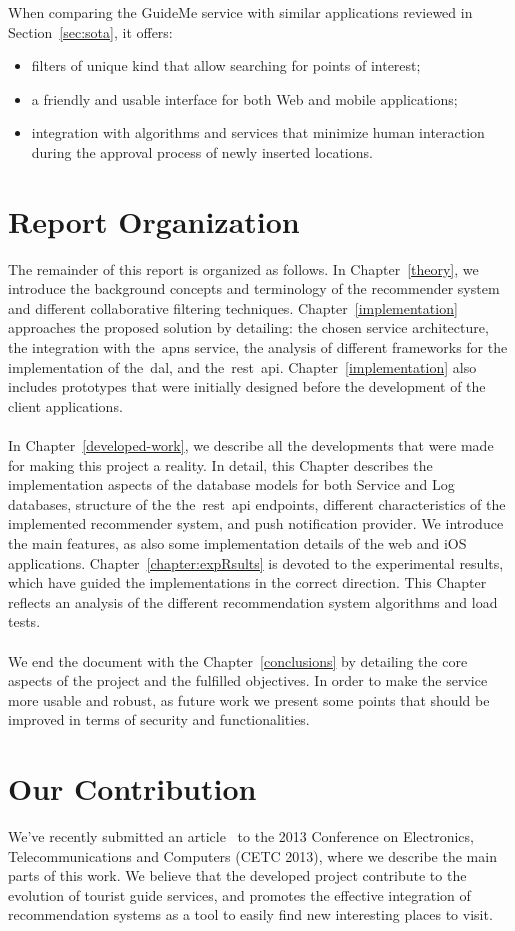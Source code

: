 When comparing the GuideMe service with similar applications reviewed in Section~\ref{sec:sota}, it offers:
\begin{itemize}
	\item filters of unique kind that allow searching for points of interest;
	\item a friendly and usable interface for both Web and mobile applications;
	\item integration with algorithms and services that minimize human interaction during the approval process of newly inserted locations.
\end{itemize}

\section{Report Organization}
\label{sec:reportOrganization}
The remainder of this report is organized as follows. In Chapter~\ref{theory}, we introduce the background concepts and terminology of the recommender system and different collaborative filtering techniques. Chapter~\ref{implementation} approaches the proposed solution by detailing: the chosen service architecture, the integration with the~\gls{apns} service, the analysis of different frameworks for the implementation of the~\gls{dal}, and the~\gls{rest}~\gls{api}. Chapter~\ref{implementation} also includes prototypes that were initially designed before the development of the client applications.\\
\\
In Chapter~\ref{developed-work}, we describe all the developments that were made for making this project a reality. In detail, this Chapter describes the implementation aspects of the database models for both Service and Log databases, structure of the the~\gls{rest}~\gls{api} endpoints, different characteristics of the implemented recommender system, and push notification provider. We introduce the main features, as also some implementation details of the web and iOS applications. Chapter~\ref{chapter:expRsults} is devoted to the experimental results, which have guided the implementations in the correct direction. This Chapter reflects an analysis of the different recommendation system algorithms and load tests.\\
\\
We end the document with the Chapter~\ref{conclusions} by detailing the core aspects of the project and the fulfilled objectives. In order to make the service more usable and robust, as future work we present some points that should be improved in terms of security and functionalities.

\section{Our Contribution}
\label{sec:ourContribution}
We've recently submitted an article~\cite{guideMeArticle} to the 2013 Conference on Electronics, Telecommunications and Computers (CETC 2013), where we describe the main parts of this work. We believe that the developed project contribute to the evolution of tourist guide services, and promotes the effective integration of recommendation systems as a tool to easily find new interesting places to visit.
\fi
